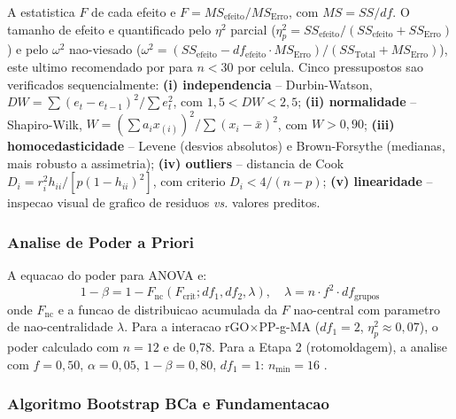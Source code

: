 \documentclass[11pt,a4paper,oneside]{article}
\begin{document}
A estatistica $F$ de cada efeito e $F{=}MS_{\text{efeito}}/MS_{\text{Erro}}$, com $MS{=}SS/df$.
O tamanho de efeito e quantificado pelo $\eta^2$ parcial ($\eta^2_p{=}SS_{\text{efeito}}/(SS_{\text{efeito}}+SS_{\text{Erro}})$) e pelo $\omega^2$ nao-viesado ($\omega^2{=}(SS_{\text{efeito}}-df_{\text{efeito}}{\cdot}MS_{\text{Erro}})/(SS_{\text{Total}}+MS_{\text{Erro}})$), este ultimo recomendado por \citet{Cohen1988} para $n{<}30$ por celula. Cinco pressupostos sao verificados sequencialmente: {\bfseries (i) independencia} -- Durbin-Watson, $DW{=}\sum(e_t{-}e_{t-1})^2/\sum e_t^2$, com $1{,}5{<}DW{<}2{,}5$; {\bfseries (ii) normalidade} -- Shapiro-Wilk, $W{=}(\sum a_i x_{(i)})^2/\sum(x_i{-}\bar{x})^2$, com $W{>}0{,}90$; {\bfseries (iii) homocedasticidade} -- Levene (desvios absolutos) e Brown-Forsythe (medianas, mais robusto a assimetria); {\bfseries (iv) outliers} -- distancia de Cook $D_i{=}r_i^2 h_{ii}/[p(1{-}h_{ii})^2]$, com criterio $D_i{<}4/(n{-}p)$; {\bfseries (v) linearidade} -- inspecao visual de grafico de residuos \textit{vs.} valores preditos.

\subsubsection{Analise de Poder a Priori}

A equacao do poder para ANOVA e:
\begin{equation}
1{-}\beta = 1 - F_{\text{nc}}(F_{\text{crit}}; df_1, df_2, \lambda),\quad \lambda = n{\cdot}f^2{\cdot}df_{\text{grupos}}
\label{eq:poder}
\end{equation}
onde $F_{\text{nc}}$ e a funcao de distribuicao acumulada da $F$ nao-central com parametro de
nao-centralidade $\lambda$. Para a interacao rGO$\times$PP-g-MA ($df_1{=}2$, $\eta^2_p{\approx}0{,}07$),
o poder calculado com $n{=}12$ e de 0,78. Para a Etapa 2 (rotomoldagem), a analise com
$f{=}0{,}50$, $\alpha{=}0{,}05$, $1{-}\beta{=}0{,}80$, $df_1{=}1$: $n_{\min}{=}16$ \cite{Cohen1988}.

\subsubsection{Algoritmo Bootstrap BCa e Fundamentacao}
\end{document}
